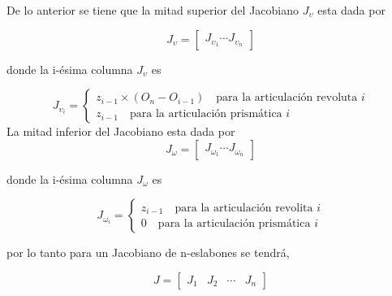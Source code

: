 \documentclass[10pt,a4paper]{article}
\begin{document}
De lo anterior se tiene que la mitad superior del Jacobiano $J_\upsilon$ esta dada por

$$
J_\upsilon = \begin{bmatrix}
	J_{\upsilon_1} \cdots J_{\upsilon_n}
\end{bmatrix}
$$

donde la i-ésima columna $J_\upsilon$ es

$$
J_{\upsilon_i} = \begin{cases}
	z_{i-1} \times ( O_n-O_{i-1} ) \quad \text{para la articulación revoluta } i \\
	z_{i-1} \quad \text{para la articulación prismática } i
\end{cases}
$$
\newpage
La mitad inferior del Jacobiano esta dada por
$$ J_\omega = \begin{bmatrix}
	J_{\omega_1} \cdots J_{\omega_n}
\end{bmatrix}
$$

donde la i-ésima columna $J_\omega$ es

$$
J_{\omega_i} = \begin{cases}
	z_{i-1} \quad \text{para la articulación revolita } i \\
	0 \quad \text{para la articulación prismática } i
\end{cases}
$$

por lo tanto para un Jacobiano de n-eslabones se tendrá,

$$
J = \begin{bmatrix}
	J_1 & J_2 & \cdots & J_n
\end{bmatrix}
$$
\end{document}
